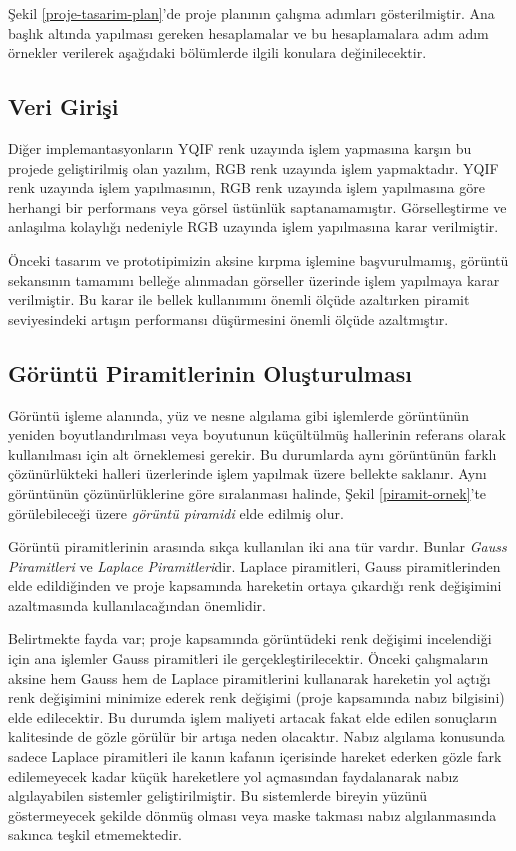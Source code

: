 \documentclass[a4paper, 12pt]{article}
\begin{document}
Şekil \ref{proje-tasarim-plan}'de proje planının çalışma adımları gösterilmiştir. Ana başlık altında yapılması gereken hesaplamalar ve bu hesaplamalara adım adım örnekler verilerek aşağıdaki bölümlerde ilgili konulara değinilecektir.



\subsection{Veri Girişi}{\label{veri-girisi}}

Diğer implemantasyonların YQIF renk uzayında işlem yapmasına\cite{YQIF}  karşın bu projede geliştirilmiş olan yazılım, RGB renk uzayında işlem yapmaktadır. YQIF renk uzayında işlem yapılmasının, RGB renk uzayında işlem yapılmasına göre herhangi bir performans veya görsel üstünlük saptanamamıştır. Görselleştirme ve anlaşılma kolaylığı nedeniyle RGB uzayında işlem yapılmasına karar verilmiştir. 

Önceki tasarım ve prototipimizin aksine kırpma işlemine başvurulmamış, görüntü sekansının tamamını belleğe alınmadan görseller üzerinde işlem yapılmaya karar verilmiştir. Bu karar ile bellek kullanımını önemli ölçüde azaltırken piramit seviyesindeki artışın performansı düşürmesini önemli ölçüde azaltmıştır. 


\subsection{Görüntü Piramitlerinin Oluşturulması}
Görüntü işleme alanında, yüz ve nesne algılama gibi işlemlerde görüntünün yeniden boyutlandırılması veya boyutunun küçültülmüş hallerinin referans olarak kullanılması\cite{eulerian-piramit}\cite{eulerian-piramit-2}\cite{eulerian-piramit-3}  için alt örneklemesi gerekir. Bu durumlarda aynı görüntünün farklı çözünürlükteki halleri üzerlerinde işlem yapılmak üzere bellekte saklanır. Aynı görüntünün çözünürlüklerine göre sıralanması halinde, Şekil \ref{piramit-ornek}'te görülebileceği üzere \textit{görüntü piramidi} elde edilmiş olur. 

Görüntü piramitlerinin arasında sıkça kullanılan iki ana tür vardır. Bunlar \textit{Gauss Piramitleri} ve \textit{Laplace Piramitleri}dir. Laplace piramitleri, Gauss piramitlerinden elde edildiğinden ve proje kapsamında hareketin ortaya çıkardığı renk değişimini azaltmasında kullanılacağından önemlidir.


Belirtmekte fayda var; proje kapsamında görüntüdeki renk değişimi incelendiği için ana işlemler Gauss piramitleri ile gerçekleştirilecektir. Önceki çalışmaların aksine hem Gauss hem de Laplace piramitlerini kullanarak hareketin yol açtığı renk değişimini minimize ederek renk değişimi (proje kapsamında nabız bilgisini) elde edilecektir. Bu durumda işlem maliyeti artacak fakat elde edilen sonuçların kalitesinde de gözle görülür bir artışa neden olacaktır. Nabız algılama konusunda sadece Laplace piramitleri ile kanın kafanın içerisinde hareket ederken gözle fark edilemeyecek kadar küçük hareketlere yol açmasından faydalanarak nabız algılayabilen sistemler geliştirilmiştir\cite{YQIF}. Bu sistemlerde bireyin yüzünü göstermeyecek şekilde dönmüş olması veya maske takması nabız algılanmasında sakınca teşkil etmemektedir.
\end{document}
